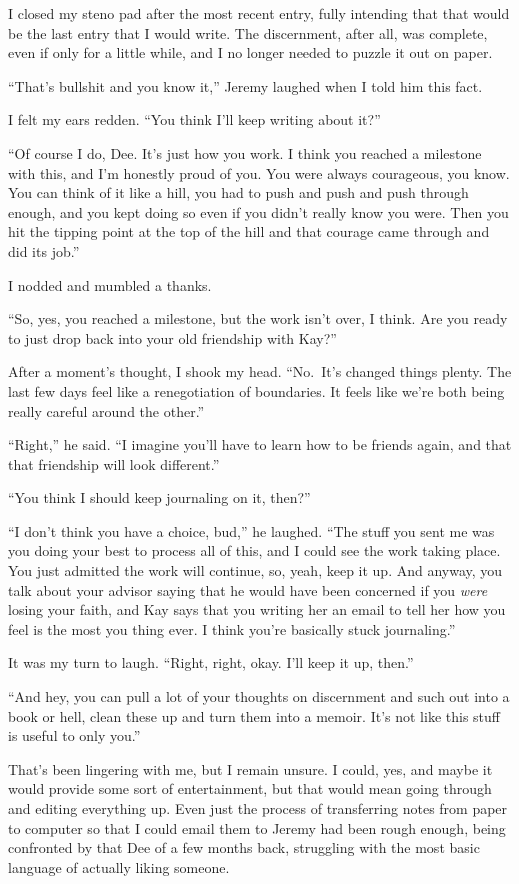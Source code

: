 I closed my steno pad after the most recent entry, fully intending that that would be the last entry that I would write. The discernment, after all, was complete, even if only for a little while, and I no longer needed to puzzle it out on paper.

``That's bullshit and you know it,'' Jeremy laughed when I told him this fact.

I felt my ears redden. ``You think I'll keep writing about it?''

``Of course I do, Dee. It's just how you work. I think you reached a milestone with this, and I'm honestly proud of you. You were always courageous, you know. You can think of it like a hill, you had to push and push and push through enough, and you kept doing so even if you didn't really know you were. Then you hit the tipping point at the top of the hill and that courage came through and did its job.''

I nodded and mumbled a thanks.

``So, yes, you reached a milestone, but the work isn't over, I think. Are you ready to just drop back into your old friendship with Kay?''

After a moment's thought, I shook my head. ``No.~It's changed things plenty. The last few days feel like a renegotiation of boundaries. It feels like we're both being really careful around the other.''

``Right,'' he said. ``I imagine you'll have to learn how to be friends again, and that that friendship will look different.''

``You think I should keep journaling on it, then?''

``I don't think you have a choice, bud,'' he laughed. ``The stuff you sent me was you doing your best to process all of this, and I could see the work taking place. You just admitted the work will continue, so, yeah, keep it up. And anyway, you talk about your advisor saying that he would have been concerned if you \emph{were} losing your faith, and Kay says that you writing her an email to tell her how you feel is the most you thing ever. I think you're basically stuck journaling.''

It was my turn to laugh. ``Right, right, okay. I'll keep it up, then.''

``And hey, you can pull a lot of your thoughts on discernment and such out into a book or hell, clean these up and turn them into a memoir. It's not like this stuff is useful to only you.''

That's been lingering with me, but I remain unsure. I could, yes, and maybe it would provide some sort of entertainment, but that would mean going through and editing everything up. Even just the process of transferring notes from paper to computer so that I could email them to Jeremy had been rough enough, being confronted by that Dee of a few months back, struggling with the most basic language of actually liking someone.

